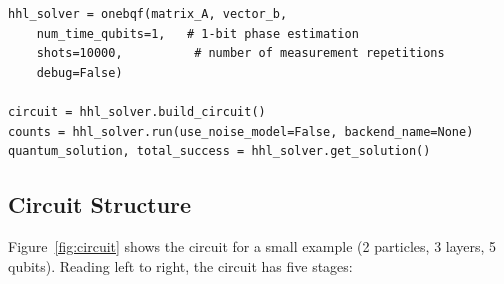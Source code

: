 \documentclass[11pt, a4paper]{article}
\begin{document}
\begin{lstlisting}[caption={Building and running the quantum circuit}]
hhl_solver = onebqf(matrix_A, vector_b,
    num_time_qubits=1,   # 1-bit phase estimation
    shots=10000,          # number of measurement repetitions
    debug=False)

circuit = hhl_solver.build_circuit()
counts = hhl_solver.run(use_noise_model=False, backend_name=None)
quantum_solution, total_success = hhl_solver.get_solution()
\end{lstlisting}

\subsection{Circuit Structure}

Figure~\ref{fig:circuit} shows the circuit for a small example (2
particles, 3 layers, 5 qubits). Reading left to right, the circuit has
five stages:
\end{document}

